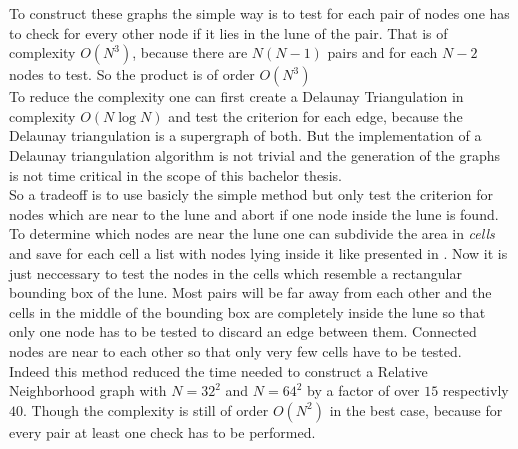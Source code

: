     To construct these graphs the simple way is to test for each
    pair of nodes one has to check for every other node if it lies in
    the lune of the pair. That is of complexity \(O (N^3)\), because
    there are \(N(N-1)\) pairs and for each \(N-2\) nodes to test. So
    the product is of order \(O(N^3)\)\\
    To reduce the complexity one can first create a Delaunay
    Triangulation in complexity \(O (N \log N)\)
    \cite{Leach1992} and test the criterion for each edge, because
    the Delaunay triangulation is a supergraph of both. But the
    implementation of a Delaunay triangulation algorithm is not trivial
    and the generation of the graphs is not time critical in the scope
    of this bachelor thesis.\\
    So a tradeoff is to use basicly the simple method but only test
    the criterion for nodes which are near to the lune and abort if
    one node inside the lune is found. To determine which nodes are
    near the lune one can subdivide the area in \emph{cells} and save
    for each cell a list with nodes lying inside it like presented in
    \cite{RNGCell}.
    Now it is just neccessary to test the nodes in the cells which
    resemble a rectangular bounding box of the lune. Most pairs will be
    far away from each other and the cells in the middle of the bounding
    box are completely inside the lune so that only one node has to be
    tested to discard an edge between them. Connected nodes are near to
    each other so that only very few cells have to be tested.\\
    Indeed this method reduced the time needed to construct a Relative
    Neighborhood graph with \(N=32^2\) and \(N=64^2\) by a factor of
    over \(15\) respectivly \(40\). Though the complexity is still of
    order \(O(N^2)\) in the best case, because for every pair at least
    one check has to be performed.

